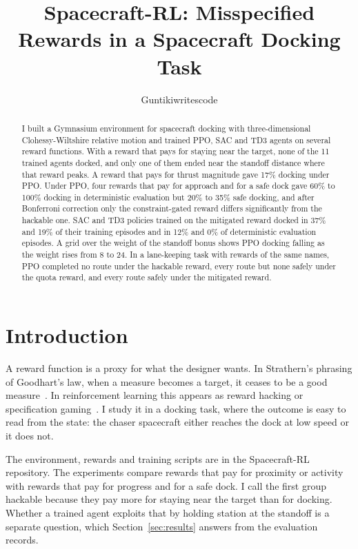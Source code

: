 \documentclass[11pt]{article}
\title{Spacecraft-RL: Misspecified Rewards in a Spacecraft Docking Task}
\author{Guntikiwritescode}
\date{}
\begin{document}
\maketitle

\begin{abstract}
I built a Gymnasium environment for spacecraft docking with three-dimensional
Clohessy-Wiltshire relative motion and trained PPO, SAC and TD3 agents on
several reward functions. With a reward that pays for staying near the target,
none of the 11 trained agents docked, and only one of them ended near the
standoff distance where that reward peaks. A reward that pays for thrust
magnitude gave 17\% docking under PPO. Under PPO, four rewards that pay for
approach and for a safe dock gave 60\% to 100\% docking in deterministic
evaluation but 20\% to 35\% safe docking, and after Bonferroni correction only
the constraint-gated reward differs significantly from the hackable one. SAC and
TD3 policies trained on the mitigated reward docked in 37\% and 19\% of their
training episodes and in 12\% and 0\% of deterministic evaluation episodes. A
grid over the weight of the standoff bonus shows PPO docking falling as the
weight rises from 8 to 24. In a lane-keeping task with rewards of the same
names, PPO completed no route under the hackable reward, every route but none
safely under the quota reward, and every route safely under the mitigated
reward.
\end{abstract}

\section{Introduction}

A reward function is a proxy for what the designer wants. In Strathern's
phrasing of Goodhart's law, when a measure becomes a target, it ceases to be a
good measure~\cite{goodhart1984,strathern1997}. In reinforcement learning this
appears as reward hacking or specification
gaming~\cite{amodei2016,krakovna2020,skalse2022}. I study it in a docking task,
where the outcome is easy to read from the state: the chaser spacecraft either
reaches the dock at low speed or it does not.

The environment, rewards and training scripts are in the Spacecraft-RL
repository. The experiments compare rewards that pay for proximity or activity
with rewards that pay for progress and for a safe dock. I call the first group
hackable because they pay more for staying near the target than for docking.
Whether a trained agent exploits that by holding station at the standoff is a
separate question, which Section~\ref{sec:results} answers from the evaluation
records.
\end{document}
